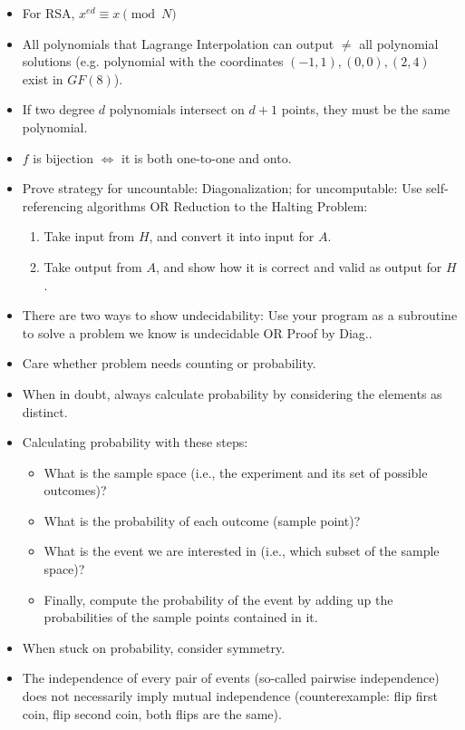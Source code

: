 \documentclass{article}
\begin{document}
\begin{itemize}
	\item For RSA, $x^{ed}\equiv x\pmod{N}$
	\item All polynomials that Lagrange Interpolation can output $\neq$ all polynomial solutions (e.g. polynomial with the coordinates $(-1,1),(0,0),(2,4)$ exist in $GF(8)$).
	\item If two degree $d$ polynomials intersect on $d + 1$ points, they must be the same polynomial.
	\item $f$ is bijection $\iff$ it is both one-to-one and onto.
	\item Prove strategy for uncountable: Diagonalization; for uncomputable: Use self-referencing algorithms OR Reduction to the Halting Problem:
	\begin{enumerate}
		\item Take input from $H$, and convert it into input for $A$.
		\item Take output from $A$, and show how it is correct and valid as output for $H$.
	\end{enumerate}
	\item There are two ways to show undecidability: Use your program as a subroutine to solve a problem we know is undecidable OR Proof by Diag..
	\item Care whether problem needs {\color{red} counting} or {\color{red} probability}.
	\item When in doubt, always calculate probability by considering the elements as distinct.
	\item Calculating probability with these steps:
	\begin{itemize}
		\item What is the sample space (i.e., the experiment and its set of possible outcomes)?
		\item What is the probability of each outcome (sample point)?
		\item What is the event we are interested in (i.e., which subset of the sample space)?
		\item Finally, compute the probability of the event by adding up the probabilities of the sample points contained in it.
	\end{itemize}
	\item When stuck on probability, consider symmetry.
	\item The independence of every pair of events (so-called pairwise independence) does not necessarily imply mutual independence (counterexample: flip first coin, flip second coin, both flips are the same).

\end{itemize}
\end{document}
